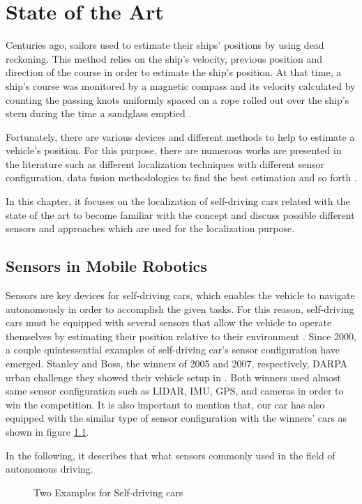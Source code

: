 \chapter{State of the Art}\label{chp:2}
Centuries ago, sailors used to estimate their ships’ positions by using dead reckoning. This method relies on the ship's velocity, previous position and direction of the course in order to estimate the ship's position. At that time, a ship’s course was monitored by a magnetic compass and its velocity calculated by counting the passing knots uniformly spaced on a rope rolled out over the ship’s stern during the time a sandglass emptied  \cite{chp2.1, chp2.2}.  

\par Fortunately, there are various devices and different methods to help to estimate a vehicle's position. For this purpose, there are numerous works are presented in the literature such as different localization techniques with different sensor configuration, data fusion methodologies to find the best estimation and so forth \cite{chp2.3}. 
\par In this chapter, it focuses on the localization of self-driving cars related with the state of the art to become familiar with the concept and discuss possible different sensors and approaches which are used for the localization purpose.

\section{Sensors in Mobile Robotics}
Sensors are key devices for self-driving cars, which enables the vehicle to navigate autonomously in order to accomplish the given tasks. For this reason, self-driving cars must be equipped with several sensors that allow the vehicle to operate themselves by estimating their position relative to their environment \cite{sensor}. Since 2000, a couple quintessential examples of self-driving car's sensor configuration have emerged. Stanley and Boss, the winners of 2005 and 2007, respectively, DARPA urban challenge they showed their vehicle setup in \cite{chp2.4, chp2.5}. Both winners used almost same sensor configuration such as LIDAR, IMU, GPS, and cameras in order to win the competition. It is also important to mention that, our car has also equipped with the similar type of sensor configuration with the winners’ cars as shown in figure \ref{fig:compare_car}.
\par In the following, it describes that what sensors commonly used in the field of autonomous driving.
\begin{figure}[H]
    \centering
    \hfill
    \caption{Two Examples for Self-driving cars}
    \label{fig:compare_car}
\end{figure}


